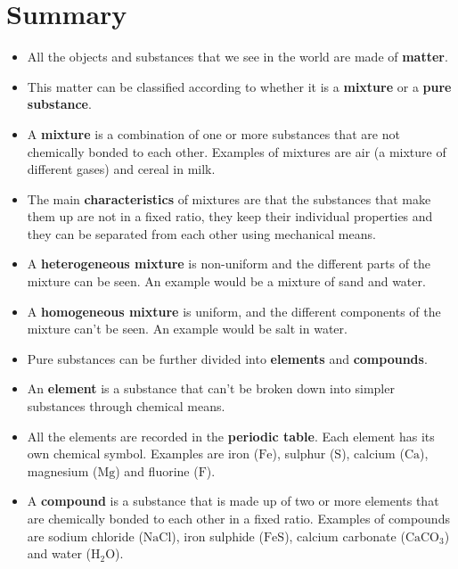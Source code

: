            \section{Summary}
            \nopagebreak
      \label{m38706*id67458}\begin{itemize}[noitemsep]
            \label{m38706*uid114}\item All the objects and substances that we see in the world are made of \textbf{matter}.
\label{m38706*uid115}\item This matter can be classified according to whether it is a \textbf{mixture} or a \textbf{pure substance}.
\label{m38706*uid116}\item A \textbf{mixture} is a combination of one or more substances that are not chemically bonded to each other. Examples of mixtures are air (a mixture of different gases) and cereal in milk.
\label{m38706*uid117}\item The main \textbf{characteristics} of mixtures are that the substances that make them up are not in a fixed ratio, they keep their individual properties and they can be separated from each other using mechanical means.
\label{m38706*uid118}\item A \textbf{heterogeneous mixture} is non-uniform and the different parts of the mixture can be seen. An example would be a mixture of sand and water.
\label{m38706*uid119}\item A \textbf{homogeneous mixture} is uniform, and the different components of the mixture can't be seen. An example would be salt in water.
\label{m38706*uid121}\item Pure substances can be further divided into \textbf{elements} and \textbf{compounds}.
\label{m38706*uid122}\item An \textbf{element} is a substance that can't be broken down into simpler substances through chemical means.
\label{m38706*uid123}\item All the elements are recorded in the \textbf{periodic table}. Each element has its own chemical symbol. Examples are iron ($\mathrm{Fe}$), sulphur ($\mathrm{S}$), calcium ($\mathrm{Ca}$), magnesium ($\mathrm{Mg}$) and fluorine ($\mathrm{F}$).
\label{m38706*uid124}\item A \textbf{compound} is a substance that is made up of two or more elements that are chemically bonded to each other in a fixed ratio. Examples of compounds are sodium chloride ($\mathrm{NaCl}$), iron sulphide ($\mathrm{FeS}$), calcium carbonate (${\mathrm{CaCO}}_{3}$) and water (${\mathrm{H}}_{2}\mathrm{O}$).

\end{itemize}
